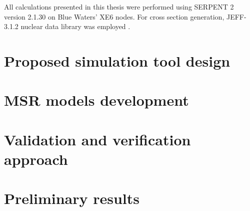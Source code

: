 All calculations presented in this thesis were performed using SERPENT 2 version 2.1.30 on Blue Waters’ XE6 nodes. For cross section generation, JEFF-3.1.2 nuclear data library was employed \cite{oecd/nea_data_bank_jeff-3.1.2_2014}. 
\section{Proposed simulation tool design}

\section{MSR models development}

\section{Validation and verification approach}

\section{Preliminary results}
